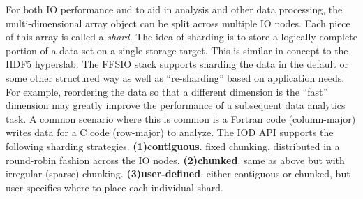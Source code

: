 \documentclass{sig-alt-gov2}
\begin{document}
For both IO performance and to aid in analysis and other data processing, the
multi-dimensional array object can be split across multiple IO nodes. Each
piece of this array is called a {\em shard}.  The idea of sharding is to store
a logically complete portion of a data set on a single storage target. This is
similar in concept to the HDF5 hyperslab.  The FFSIO stack supports sharding
the data in the default or some other structured way as well as ``re-sharding''
based on application needs. For example, reordering the data so that a
different dimension is the ``fast'' dimension may greatly improve the
performance of a subsequent data analytics task. A common scenario where this
is common is a Fortran code (column-major) writes data for a C code (row-major)
to analyze.  The IOD API supports the following sharding strategies.
%
  \textbf{(1)contiguous}. fixed chunking, distributed in a round-robin
  fashion across the IO nodes.
  \textbf{(2)chunked}. same as above but with irregular (sparse) chunking.
  \textbf{(3)user-defined}. either contiguous or chunked, but user specifies
  where to place each individual shard.

%
\end{document}
